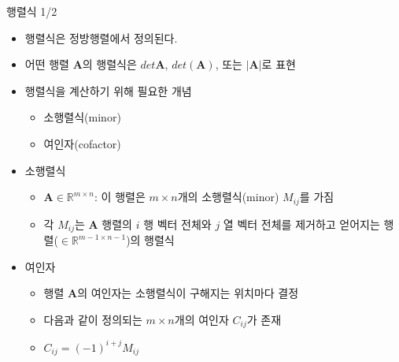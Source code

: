 \begin{frame}{행렬식 1/2}

\begin{itemize}
\item 행렬식은 정방행렬에서 정의된다.
\item 어떤 행렬 $\mathbf A$의 행렬식은 $det \mathbf A$, $det(\mathbf A)$, 또는 $|\mathbf A|$로 표현
\item 행렬식을 계산하기 위해 필요한 개념
	\begin{itemize}
	\item 소행렬식(minor)
	\item 여인자(cofactor)
	\end{itemize}
\item 소행렬식
	\begin{itemize}
	\item $\mathbf A \in \mathbb R^{m \times n}$: 이 행렬은 $m \times n$개의 소행렬식(minor) $M_{ij}$를 가짐
	\item 각 $M_{ij}$는 $\mathbf A$ 행렬의 $i$ 행 벡터 전체와 $j$ 열 벡터 전체를 제거하고 얻어지는 행렬($\in \mathbb R^{m-1 \times n-1}$)의 
행렬식
	\end{itemize}
\item 여인자
	\begin{itemize}
	\item 행렬 $\mathbf A$의 여인자는 소행렬식이 구해지는 위치마다 결정
	\item 다음과 같이 정의되는 $m \times n$개의 여인자 $C_{ij}$가 존재
	\item $C_{ij} = (-1)^{i+j} M_{ij}$
	\end{itemize}
\end{itemize}

\end{frame}


